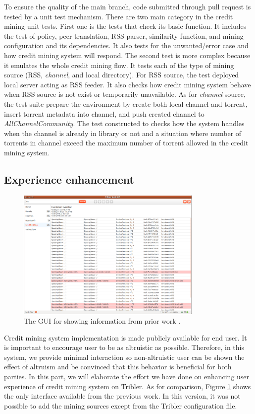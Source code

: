 To ensure the quality of the main branch, code submitted through pull request is tested by a unit test mechanism. There are two main category in the credit mining unit tests. First one is the tests that check its basic function. It includes the test of policy, peer translation, RSS parser, similarity function, and mining configuration and its dependencies. It also tests for the unwanted/error case and how credit mining system will respond. The second test is more complex because it emulates the whole credit mining flow. It tests each of the type of mining source (RSS, \textit{channel}, and local directory). For RSS source, the test deployed local server acting as RSS feeder. It also checks how credit mining system behave when RSS source is not exist or temporarily unavailable. As for \textit{channel} source, the test suite prepare the environment by create both local channel and torrent, insert torrent metadata into channel, and push created channel to \textit{AllChannelCommunity}. The test constructed to checks how the system handles when the channel is already in library or not and a situation where number of torrents in channel exceed the maximum number of torrent allowed in the credit mining system. 

\subsection{Experience enhancement}
\begin{figure}[t]
	\centering
	\includegraphics[width=0.8\textwidth]{pics/old_cm.png}
	\caption{The GUI for showing information from prior work \cite{2015:creditmining:capota}.}
	\label{fig:oldcm}
\end{figure}

Credit mining system implementation is made publicly available for end user. It is important to encourage user to be as altruistic as possible. Therefore, in this system, we provide minimal interaction so non-altruistic user can be shown the effect of altruism and be convinced that this behavior is beneficial for both parties. In this part, we will elaborate the effort we have done on enhancing user experience of credit mining system on Tribler. As for comparison, Figure \ref{fig:oldcm} shows the only interface available from the previous work. In this version, it was not possible to add the mining sources except from the Tribler configuration file. 

